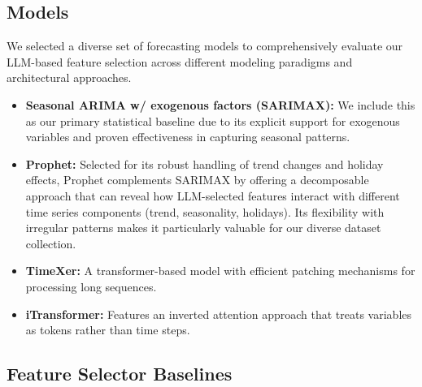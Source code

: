 \documentclass[conference]{IEEEtran}
\begin{document}
\subsection{Models}

We selected a diverse set of forecasting models to comprehensively evaluate our LLM-based feature selection across different modeling paradigms and architectural approaches.

\begin{itemize}
\item \textbf{Seasonal ARIMA w/ exogenous factors (SARIMAX):} We include this as our primary statistical baseline due to its explicit support for exogenous variables and proven effectiveness in capturing seasonal patterns.

\item \textbf{Prophet:} Selected for its robust handling of trend changes and holiday effects, Prophet complements SARIMAX by offering a decomposable approach that can reveal how LLM-selected features interact with different time series components (trend, seasonality, holidays). Its flexibility with irregular patterns makes it particularly valuable for our diverse dataset collection.

\item \textbf{TimeXer:} A transformer-based model with efficient patching mechanisms for processing long sequences.

\item \textbf{iTransformer:} Features an inverted attention approach that treats variables as tokens rather than time steps.

\end{itemize}




\subsection{Feature Selector Baselines}
\end{document}
